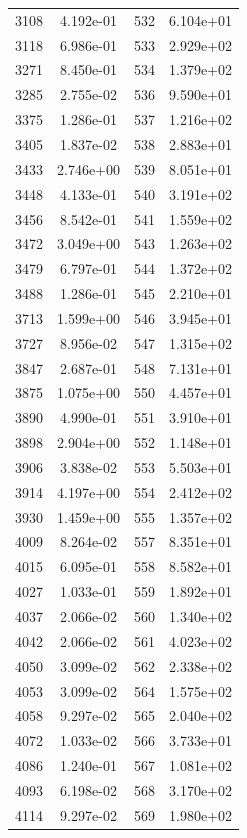 \documentclass[12pt]{article}
\begin{document}
\begin{longtable}{@{}cccc@{}}
3108 & 4.192e-01 & 532 & 6.104e+01 \\
3118 & 6.986e-01 & 533 & 2.929e+02 \\
3271 & 8.450e-01 & 534 & 1.379e+02 \\
3285 & 2.755e-02 & 536 & 9.590e+01 \\
3375 & 1.286e-01 & 537 & 1.216e+02 \\
3405 & 1.837e-02 & 538 & 2.883e+01 \\
3433 & 2.746e+00 & 539 & 8.051e+01 \\
3448 & 4.133e-01 & 540 & 3.191e+02 \\
3456 & 8.542e-01 & 541 & 1.559e+02 \\
3472 & 3.049e+00 & 543 & 1.263e+02 \\
3479 & 6.797e-01 & 544 & 1.372e+02 \\
3488 & 1.286e-01 & 545 & 2.210e+01 \\
3713 & 1.599e+00 & 546 & 3.945e+01 \\
3727 & 8.956e-02 & 547 & 1.315e+02 \\
3847 & 2.687e-01 & 548 & 7.131e+01 \\
3875 & 1.075e+00 & 550 & 4.457e+01 \\
3890 & 4.990e-01 & 551 & 3.910e+01 \\
3898 & 2.904e+00 & 552 & 1.148e+01 \\
3906 & 3.838e-02 & 553 & 5.503e+01 \\
3914 & 4.197e+00 & 554 & 2.412e+02 \\
3930 & 1.459e+00 & 555 & 1.357e+02 \\
4009 & 8.264e-02 & 557 & 8.351e+01 \\
4015 & 6.095e-01 & 558 & 8.582e+01 \\
4027 & 1.033e-01 & 559 & 1.892e+01 \\
4037 & 2.066e-02 & 560 & 1.340e+02 \\
4042 & 2.066e-02 & 561 & 4.023e+02 \\
4050 & 3.099e-02 & 562 & 2.338e+02 \\
4053 & 3.099e-02 & 564 & 1.575e+02 \\
4058 & 9.297e-02 & 565 & 2.040e+02 \\
4072 & 1.033e-02 & 566 & 3.733e+01 \\
4086 & 1.240e-01 & 567 & 1.081e+02 \\
4093 & 6.198e-02 & 568 & 3.170e+02 \\
4114 & 9.297e-02 & 569 & 1.980e+02 \\

\bottomrule
\end{longtable}
\end{document}
